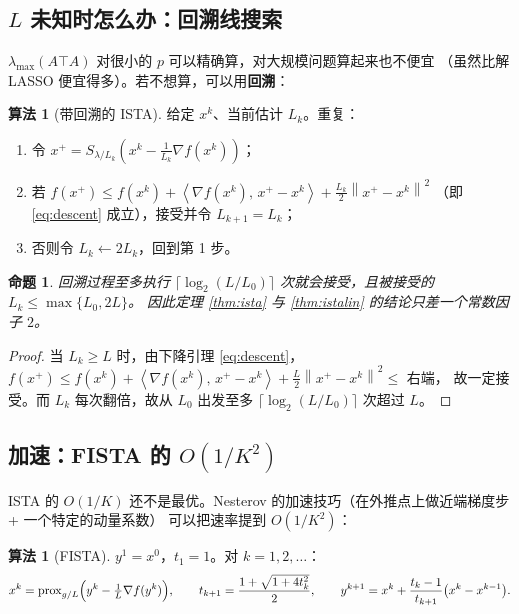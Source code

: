 \documentclass[11pt,a4paper,UTF8]{ctexart}
\theoremstyle{plain}
\newtheorem{proposition}[theorem]{命题}
\theoremstyle{definition}
\newtheorem{algorithmbox}[theorem]{算法}
\theoremstyle{remark}
\newcommand{\norm}[1]{\left\lVert #1 \right\rVert}
\newcommand{\inner}[2]{\left\langle #1,\, #2 \right\rangle}
\newcommand{\prox}{\operatorname{prox}}
\begin{document}
\subsection{$L$ 未知时怎么办：回溯线搜索}

$\lambda_{\max}(A\top A)$ 对很小的 $p$ 可以精确算，对大规模问题算起来也不便宜
（虽然比解 LASSO 便宜得多）。若不想算，可以用\textbf{回溯}：

\begin{algorithmbox}[带回溯的 ISTA]
给定 $x^k$、当前估计 $L_{k}$。重复：
\begin{enumerate}
\item 令 $x^+=S_{\lambda/L_k}(x^k-\frac{1}{L_k}\nabla f(x^k))$；
\item 若
$f(x^+)\le f(x^k)+\inner{\nabla f(x^k)}{x^+-x^k}+\frac{L_k}{2}\norm{x^+-x^k}^2$
（即 \eqref{eq:descent} 成立），接受并令 $L_{k+1}=L_k$；
\item 否则令 $L_k\leftarrow2L_k$，回到第 1 步。
\end{enumerate}
\end{algorithmbox}

\begin{proposition}
回溯过程至多执行 $\lceil\log_2(L/L_0)\rceil$ 次就会接受，且被接受的 $L_k\le\max\{L_0,2L\}$。
因此定理 \ref{thm:ista} 与 \ref{thm:istalin} 的结论只差一个常数因子 $2$。
\end{proposition}

\begin{proof}
当 $L_k\ge L$ 时，由下降引理 \eqref{eq:descent}，
$f(x^+)\le f(x^k)+\inner{\nabla f(x^k)}{x^+-x^k}+\frac L2\norm{x^+-x^k}^2\le$ 右端，
故一定接受。而 $L_k$ 每次翻倍，故从 $L_0$ 出发至多 $\lceil\log_2(L/L_0)\rceil$ 次超过 $L$。
\end{proof}

\subsection{加速：FISTA 的 $O(1/K^2)$}

ISTA 的 $O(1/K)$ 还不是最优。Nesterov 的加速技巧（在外推点上做近端梯度步 + 一个特定的动量系数）
可以把速率提到 $O(1/K^2)$：

\begin{algorithmbox}[FISTA]
$y^1=x^0$，$t_1=1$。对 $k=1,2,\dots$：
\[
x^k=\prox_{g/L}\Bigl(y^k-\tfrac1L\nabla f(y^k)\Bigr),\qquad
t_{k+1}=\frac{1+\sqrt{1+4t_k^2}}{2},\qquad
y^{k+1}=x^k+\frac{t_k-1}{t_{k+1}}\bigl(x^k-x^{k-1}\bigr).
\]
\end{algorithmbox}
\end{document}
